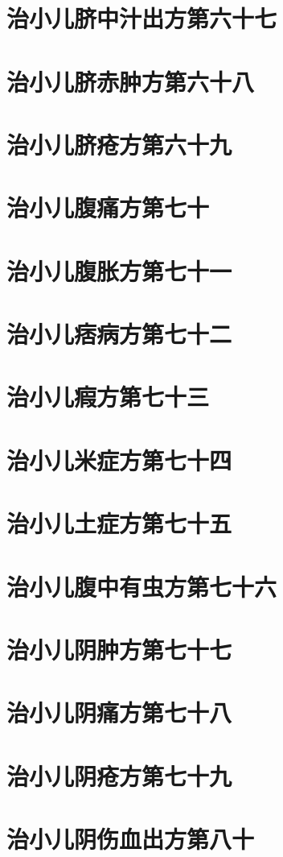 \documentclass[a4paper,12pt,UTF8,twoside]{ctexbook}
\begin{document}
\chapter{治小儿脐中汁出方第六十七}
\chapter{治小儿脐赤肿方第六十八}
\chapter{治小儿脐疮方第六十九}
\chapter{治小儿腹痛方第七十}
\chapter{治小儿腹胀方第七十一}
\chapter{治小儿痞病方第七十二}
\chapter{治小儿瘕方第七十三}
\chapter{治小儿米症方第七十四}
\chapter{治小儿土症方第七十五}
\chapter{治小儿腹中有虫方第七十六}
\chapter{治小儿阴肿方第七十七}
\chapter{治小儿阴痛方第七十八}
\chapter{治小儿阴疮方第七十九}
\chapter{治小儿阴伤血出方第八十}
\end{document}
